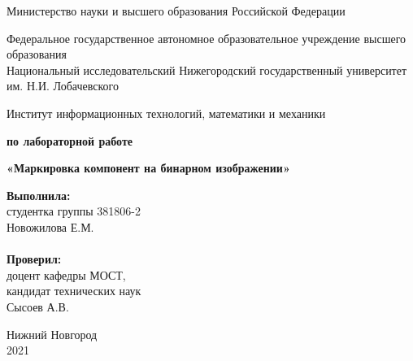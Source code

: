 \documentclass{report}
\begin{document}
\begin{titlepage}

\begin{center}
Министерство науки и высшего образования Российской Федерации
\end{center}

\begin{center}
Федеральное государственное автономное образовательное учреждение высшего образования \\
Национальный исследовательский Нижегородский государственный университет им. Н.И. Лобачевского
\end{center}

\begin{center}
Институт информационных технологий, математики и механики
\end{center}

\vspace{4em}

\begin{center}
\textbf{ по лабораторной работе} \\
\end{center}
\begin{center}
\textbf{\Large«Маркировка компонент на бинарном изображении»} \\
\end{center}

\vspace{4em}

\newbox{\lbox}
\newlength{\maxl}
\setlength{\maxl}{\wd\lbox}
\hfill\parbox{7cm}{
\hspace*{5cm}\hspace*{-5cm}\textbf{Выполнила:} \\ студентка группы 381806-2 \\ Новожилова Е.М.\\
\\
\hspace*{5cm}\hspace*{-5cm}\textbf{Проверил:}\\ доцент кафедры МОСТ, \\ кандидат технических наук \\ Сысоев А.В.\\
}
\vspace{\fill}

\begin{center} Нижний Новгород \\ 2021 \end{center}

\end{titlepage}
\end{document}
